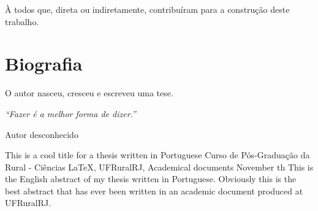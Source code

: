 \documentclass[tese]{UFRuralRJ}
\begin{document}
À todos que, direta ou indiretamente, contribuíram para a construção deste 
trabalho.


\chapter*{Biografia}
O autor nasceu, cresceu e escreveu uma tese.


\clearpage\mbox{}\vfill\hspace{80mm}\begin{minipage}{76mm}\begin{flushright}{\em
``Fazer é a melhor forma de dizer.''
\par
Autor desconhecido
}\end{flushright}\end{minipage}


\generalabstracttrue
\begin{abstract}
Este é o resumo em português de minha tese escrita em português. Claramente, 
este é o melhor resumo que já foi escrito em um documento acadêmico produzido na
UFRuralRJ.
\end{abstract}


\generalabstracttrue
\begin{englishabstract}
{This is a cool title for a thesis written in Portuguese} %
{Curso de Pós-Graduação da Rural - Ciências} %
{LaTeX, UFRuralRJ, Academical documents} %
{November} %
{th} %
This is the English abstract of my thesis written in Portuguese. Obviously this
is the best abstract that has ever been written in an academic document produced
at UFRuralRJ.
\end{englishabstract}
\end{document}
